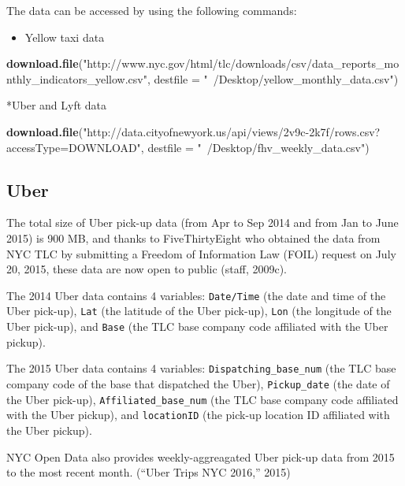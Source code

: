 \documentclass[12pt,twoside]{reedthesis}
\newenvironment{Shaded}{\begin{snugshade}}{\end{snugshade}}
\newcommand{\KeywordTok}[1]{\textcolor[rgb]{0.13,0.29,0.53}{\textbf{#1}}}
\newcommand{\DataTypeTok}[1]{\textcolor[rgb]{0.13,0.29,0.53}{#1}}
\newcommand{\StringTok}[1]{\textcolor[rgb]{0.31,0.60,0.02}{#1}}
\newcommand{\NormalTok}[1]{#1}
\providecommand{\tightlist}{%
  \setlength{\itemsep}{0pt}\setlength{\parskip}{0pt}}
\theoremstyle{definition}
\theoremstyle{definition}
\theoremstyle{definition}
\theoremstyle{remark}
\begin{document}
The data can be accessed by using the following commands:
\begin{itemize}
\tightlist
\item
  Yellow taxi data
\end{itemize}
\begin{Shaded}
\begin{Highlighting}[]
\KeywordTok{download.file}\NormalTok{(}\StringTok{"http://www.nyc.gov/html/tlc/downloads/csv/data_reports_monthly_indicators_yellow.csv"}\NormalTok{, }\DataTypeTok{destfile =} \StringTok{"~/Desktop/yellow_monthly_data.csv"}\NormalTok{)}
\end{Highlighting}
\end{Shaded}
*Uber and Lyft data
\begin{Shaded}
\begin{Highlighting}[]
\KeywordTok{download.file}\NormalTok{(}\StringTok{"http://data.cityofnewyork.us/api/views/2v9c-2k7f/rows.csv?accessType=DOWNLOAD"}\NormalTok{, }\DataTypeTok{destfile =} \StringTok{"~/Desktop/fhv_weekly_data.csv"}\NormalTok{)}
\end{Highlighting}
\end{Shaded}
\subsection{Uber}\label{uber-1}

The total size of Uber pick-up data (from Apr to Sep 2014 and from Jan
to June 2015) is 900 MB, and thanks to FiveThirtyEight who obtained the
data from NYC TLC by submitting a Freedom of Information Law (FOIL)
request on July 20, 2015, these data are now open to public (staff,
2009c).

The 2014 Uber data contains 4 variables: \texttt{Date/Time} (the date
and time of the Uber pick-up), \texttt{Lat} (the latitude of the Uber
pick-up), \texttt{Lon} (the longitude of the Uber pick-up), and
\texttt{Base} (the TLC base company code affiliated with the Uber
pickup).

The 2015 Uber data contains 4 variables: \texttt{Dispatching\_base\_num}
(the TLC base company code of the base that dispatched the Uber),
\texttt{Pickup\_date} (the date of the Uber pick-up),
\texttt{Affiliated\_base\_num} (the TLC base company code affiliated
with the Uber pickup), and \texttt{locationID} (the pick-up location ID
affiliated with the Uber pickup).

NYC Open Data also provides weekly-aggreagated Uber pick-up data from
2015 to the most recent month. (``Uber Trips NYC 2016,'' 2015)
\end{document}
